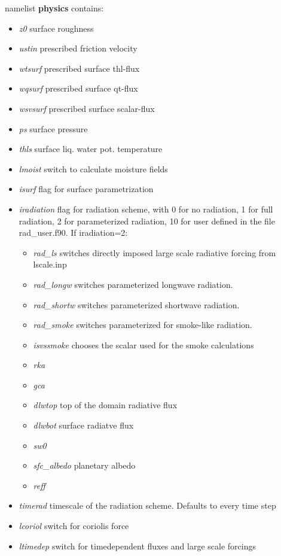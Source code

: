 \documentclass[a4paper,10pt]{article}
\begin{document}
namelist \textbf{physics} contains:
\begin{itemize}
 \item \textit{z0} surface roughness
\item \textit{ustin} prescribed friction velocity
\item \textit{wtsurf} prescribed surface thl-flux
\item \textit{wqsurf} prescribed surface qt-flux
\item \textit{wsvsurf} prescribed surface scalar-flux
\item \textit{ps} surface pressure
\item \textit{thls} surface liq. water pot. temperature
\item \textit{lmoist} switch to calculate moisture fields
\item \textit{isurf} flag for surface parametrization
\item \textit{iradiation} flag for radiation scheme, with 0 for no radiation, 1 for full radiation, 2 for parameterized radiation, 10 for user defined in the file rad\_user.f90. If iradiation=2:
 \begin{itemize}
 \item \textit{rad\_ls} switches directly imposed large scale radiative forcing from lscale.inp
\item \textit{rad\_longw} switches parameterized longwave radiation.
\item \textit{rad\_shortw} switches parameterized shortwave radiation.
\item \textit{rad\_smoke} switches parameterized for smoke-like radiation.
\item \textit{isvssmoke} chooses the scalar used for the smoke calculations
\item \textit{rka}
\item \textit{gca}
\item \textit{dlwtop} top of the domain radiative flux
\item \textit{dlwbot} surface radiatve flux
\item \textit{sw0}
\item \textit{sfc\_albedo} planetary albedo
\item \textit{reff}
\end{itemize}
\item \textit{timerad} timescale of the radiation scheme. Defaults to every time step
\item \textit{lcoriol} switch for coriolis force
\item \textit{ltimedep} switch for timedependent fluxes and large scale forcings
\end{itemize}
\end{document}
